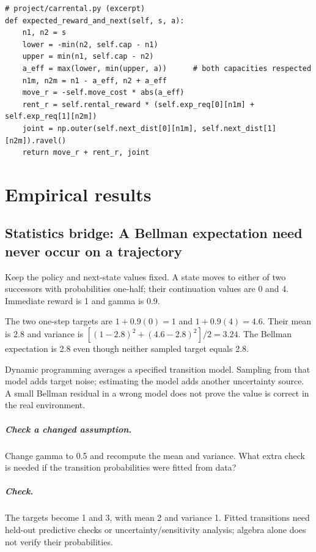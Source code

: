 \documentclass[11pt,oneside]{scrbook}
\begin{document}
\begin{codebox}
\begin{verbatim}
# project/carrental.py (excerpt)
def expected_reward_and_next(self, s, a):
    n1, n2 = s
    lower = -min(n2, self.cap - n1)
    upper = min(n1, self.cap - n2)
    a_eff = max(lower, min(upper, a))      # both capacities respected
    n1m, n2m = n1 - a_eff, n2 + a_eff
    move_r = -self.move_cost * abs(a_eff)
    rent_r = self.rental_reward * (self.exp_req[0][n1m] + self.exp_req[1][n2m])
    joint = np.outer(self.next_dist[0][n1m], self.next_dist[1][n2m]).ravel()
    return move_r + rent_r, joint
\end{verbatim}
\end{codebox}

\chapter{Empirical results}

\section{Statistics bridge: A Bellman expectation need never occur on a trajectory}
\begin{example}
Keep the policy and next-state values fixed. A state moves to either of two successors with probabilities one-half; their continuation values are 0 and 4. Immediate reward is 1 and gamma is 0.9.

The two one-step targets are $1+0.9(0)=1$ and $1+0.9(4)=4.6$. Their mean is $2.8$ and variance is $[(1-2.8)^2+(4.6-2.8)^2]/2=3.24$. The Bellman expectation is 2.8 even though neither sampled target equals 2.8.
\end{example}
Dynamic programming averages a specified transition model. Sampling from that model adds target noise; estimating the model adds another uncertainty source. A small Bellman residual in a wrong model does not prove the value is correct in the real environment.

\paragraph{Check a changed assumption.} Change gamma to 0.5 and recompute the mean and variance. What extra check is needed if the transition probabilities were fitted from data?
\paragraph{Check.} The targets become 1 and 3, with mean 2 and variance 1. Fitted transitions need held-out predictive checks or uncertainty/sensitivity analysis; algebra alone does not verify their probabilities.
\end{document}

